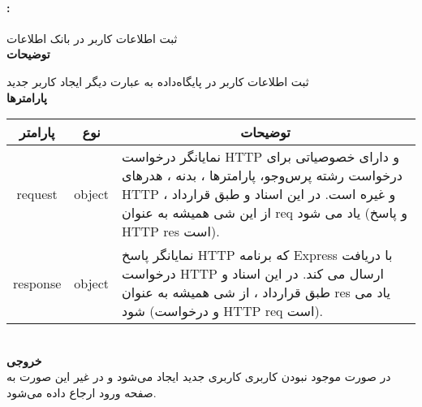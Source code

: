 \paragraph{:}
ثبت اطلاعات کاربر در بانک اطلاعات
\\
\textbf{توضیحات}
\hr
\begin{flushleft}
	\framebox[.9\textwidth][l]{
		\lr{
			\textcolor{type}{void}
			\textcolor{func}{postRegister}
			\textcolor{symb}{(}
			\textcolor{type}{object}
			\textcolor{arg}{request}
			\textcolor{symb}{,}
			\textcolor{type}{object}
			\textcolor{arg}{response}
			\textcolor{symb}{);}
		}
	}
\end{flushleft}
ثبت اطلاعات کاربر در پایگاه‌داده به عبارت دیگر ایجاد کاربر جدید
\\
\textbf{پارامترها}
\hr \\[10pt]
\begin{tabular}{|m{4cm}|m{3cm}|m{10cm}|}
	\hline
	\multicolumn{1}{|c}{پارامتر}
	&
	\multicolumn{1}{|c}{نوع}
	&
	\multicolumn{1}{|c|}{توضیحات}
	\\
	\hline
	\multicolumn{1}{|c}{request}
	&
	\multicolumn{1}{|c|}{object}
	&
	نمایانگر درخواست HTTP و دارای خصوصیاتی برای درخواست رشته پرس‌و‌جو، پارامترها ، بدنه ، هدرهای HTTP و غیره است.
	در این اسناد و طبق قرارداد ، از این شی همیشه به عنوان req یاد می شود (و پاسخ HTTP res است).
	\\
	\hline
	\multicolumn{1}{|c}{response}
	&
	\multicolumn{1}{|c|}{object}
	&
	نمایانگر پاسخ HTTP که برنامه Express با دریافت درخواست HTTP ارسال می کند.
	در این اسناد و طبق قرارداد ، از شی همیشه به عنوان res یاد می شود (و درخواست HTTP req است).
	\\
	\hline
\end{tabular}
\\[10pt]
\textbf{خروجی}
\hr \\
در صورت موجود نبودن کاربری کاربری جدید ایجاد می‌شود و در غیر این صورت به صفحه ورود ارجاع داده می‌شود.

